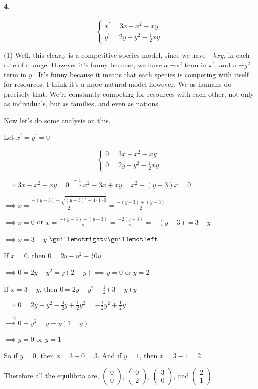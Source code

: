 \documentclass{article}
\begin{document}
\newpage
\paragraph{4.}

\[\begin{cases}
x^\prime = 3x -x^2 -xy\\
y^\prime = 2y -y^2 -\frac{1}{2}xy
\end{cases}\]

(1) Well, this clearly is a competitive species model, since we have
$-b xy$, in each rate of change. However it's funny because, we have a
$-x^2$ term in $x^\prime$, and a $-y^2$ term in $y^\prime$. It's funny
because it means that each species is competing with itself for
resources. I think it's a more natural model however. We as humans do
precisely that. We're constantly competing for resources with
each other, not only as individuals, but as families, and even as nations.

Now let's do some analysis on this.

Let $x^\prime = y^\prime = 0$

\[\begin{cases}
0 = 3x -x^2 -xy\\
0 = 2y -y^2 -\frac{1}{2}xy
\end{cases}\]

$\implies 3x -x^2 -xy = 0 \stackrel{\cdot -1}{\implies}
x^2 -3x + xy = x^2 + (y-3)x=0$

$\implies x= \frac{-(y-3)\pm \sqrt{(y-3)^2-4\cdot 1\cdot 0}}{2}
=\frac{-(y-3)\pm(y-3)}{2}$

$\implies x = 0$ or $x = \frac{-(y-3)-(y-3)}{2} =\frac{-2(y-3)}{2} =
-(y-3) = 3-y$

$\implies x = 3 -y $ $\guillemotright a \guillemotleft$

If $x = 0$, then $0 = 2y -y^2 -\frac{1}{2}0y$

$\implies 0 = 2y - y^2 =
y(2-y) \implies y = 0$  or $y = 2$

If $x = 3-y$, then $0 = 2y -y^2 -\frac{1}{2}(3-y)y $

$\implies 0 = 2y -y^2 -\frac{3}{2}y+ \frac{1}{2}y^2 = -\frac{1}{2}y^2
+\frac{1}{2}y$

$\stackrel{\cdot -2}{\implies} 0= y^2 - y = y(1-y)$

$\implies y = 0$ or $y = 1$

So if $y = 0$, then $x = 3-0 =3$. And if $y = 1$, then $x = 3 -1 = 2$.

Therefore all the equilibria are, $\begin{pmatrix} 0\\0\end{pmatrix}$,
$\begin{pmatrix} 0\\2\end{pmatrix}$, $\begin{pmatrix}
  3\\0\end{pmatrix}$, and $\begin{pmatrix} 2\\1\end{pmatrix}$.
\end{document}

